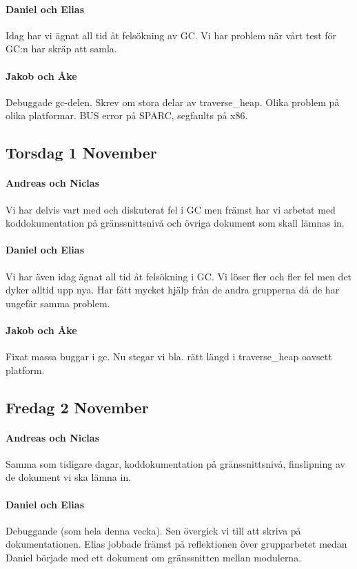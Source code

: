 \documentclass{article}
\begin{document}
\paragraph*{Daniel och Elias}
Idag har vi ägnat all tid åt felsökning av GC. Vi har problem när vårt test för GC:n har skräp att samla.

\paragraph*{Jakob och Åke}
Debuggade gc-delen. Skrev om stora delar av traverse\_heap. Olika problem på olika platformar. BUS error på SPARC, segfaults på x86.

\subsection{Torsdag 1 November}
\paragraph*{Andreas och Niclas} Vi har delvis vart med och diskuterat fel i GC men främst har vi arbetat med koddokumentation på gränssnittsnivå och övriga dokument som skall lämnas in.

\paragraph*{Daniel och Elias} Vi har även idag ägnat all tid åt felsökning i GC. Vi löser fler och fler fel men det dyker alltid upp nya. Har fått mycket hjälp från de andra grupperna då de har ungefär samma problem.

\paragraph*{Jakob och Åke} Fixat massa buggar i gc. Nu stegar vi bla. rätt längd i traverse\_heap oavsett platform.

\subsection{Fredag 2 November}
\paragraph*{Andreas och Niclas} Samma som tidigare dagar, koddokumentation på gränssnittsnivå, finslipning av de dokument vi ska lämna in.

\paragraph*{Daniel och Elias} Debuggande (som hela denna vecka). Sen övergick vi till att skriva på dokumentationen. Elias jobbade främst på reflektionen över grupparbetet medan Daniel började med ett dokument om gränssnitten mellan modulerna.
\end{document}
